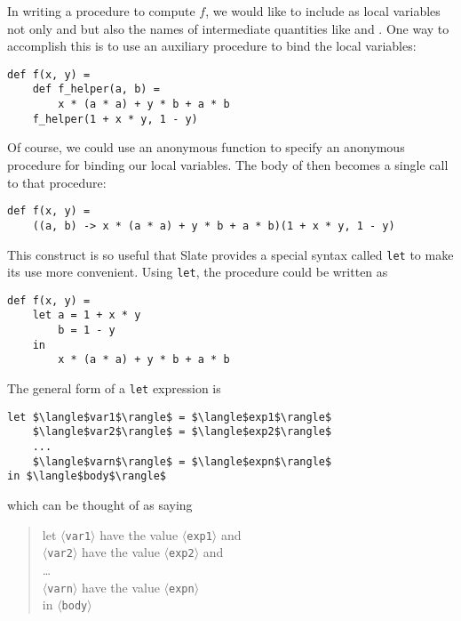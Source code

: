 In writing a procedure to compute $f$, we would like to include as local variables not only  and  but also the names of intermediate quantities like  and . One way to accomplish this is to use an auxiliary procedure to bind the local variables:

\begin{lstlisting}[style=slate]
def f(x, y) =
    def f_helper(a, b) =
        x * (a * a) + y * b + a * b
    f_helper(1 + x * y, 1 - y)
\end{lstlisting}

Of course, we could use an anonymous function to specify an anonymous procedure for binding our local variables. The body of  then becomes a single call to that procedure:

\begin{lstlisting}[style=slate]
def f(x, y) =
    ((a, b) -> x * (a * a) + y * b + a * b)(1 + x * y, 1 - y)
\end{lstlisting}

This construct is so useful that Slate provides a special syntax called \texttt{let} to make its use more convenient. Using \texttt{let}, the  procedure could be written as

\begin{lstlisting}[style=slate]
def f(x, y) =
    let a = 1 + x * y
        b = 1 - y
    in
        x * (a * a) + y * b + a * b
\end{lstlisting}

The general form of a \texttt{let} expression is

\begin{lstlisting}[style=plain]
let $\langle$var1$\rangle$ = $\langle$exp1$\rangle$
    $\langle$var2$\rangle$ = $\langle$exp2$\rangle$
    ...
    $\langle$varn$\rangle$ = $\langle$expn$\rangle$
in $\langle$body$\rangle$
\end{lstlisting}

which can be thought of as saying

\begin{quote}
let \texttt{$\langle$var1$\rangle$} have the value \texttt{$\langle$exp1$\rangle$} and\\
\texttt{$\langle$var2$\rangle$} have the value \texttt{$\langle$exp2$\rangle$} and\\
\ldots\\
\texttt{$\langle$varn$\rangle$} have the value \texttt{$\langle$expn$\rangle$}\\
in \texttt{$\langle$body$\rangle$}
\end{quote}

